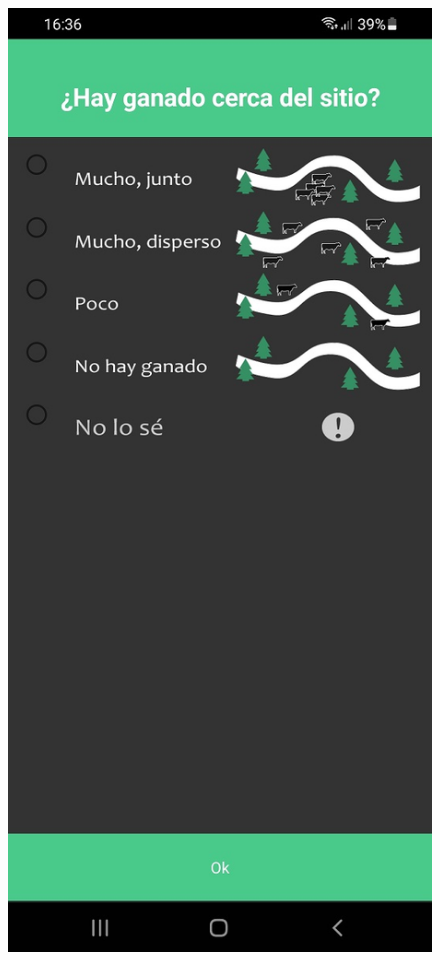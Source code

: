 \begin{figure}[H]
  \centering
   \includegraphics[scale=0.3]{06-caso_de_uso/appear_ganado.jpg} 

\end{figure}
